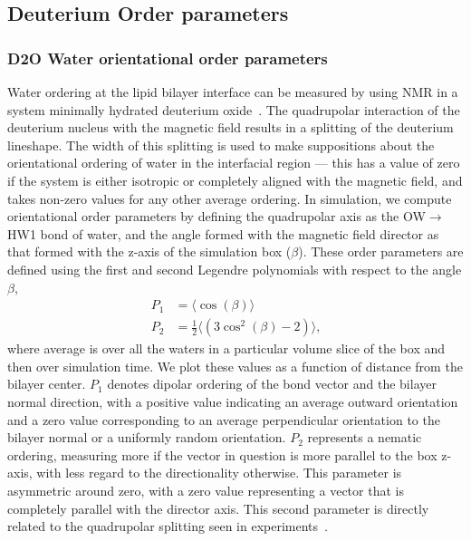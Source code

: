 \subsection{Deuterium Order parameters}
\subsubsection{D2O Water orientational order parameters}
Water ordering at the lipid bilayer interface can be measured by using NMR in a system minimally hydrated deuterium oxide~\cite{aaman:2003}.
The quadrupolar interaction of the deuterium nucleus with the magnetic field results in a splitting of the deuterium lineshape. The width of this splitting 
is used to make suppositions about the orientational ordering of water in the interfacial region --- this has a value of zero if the system is either isotropic or completely aligned with the
magnetic field, and takes non-zero values for any other average ordering.
In simulation, we compute 
orientational order parameters by defining the quadrupolar axis as the
OW$\rightarrow$HW1 bond of water, and the angle formed with the magnetic field director 
as that formed with the z-axis of the simulation box ($\beta$). 
These order parameters are defined using the first and second 
Legendre polynomials with respect to the angle $\beta$,
\begin{equation}
    \begin{split}
    P_1&=\langle \cos\left(\beta\right) \rangle
    \\ P_2&=\frac{1}{2}\bigg\langle\left(3\cos^2\left(\beta\right)-2\right)\bigg\rangle
    \text{,} 
\end{split}
\end{equation}
where average is over all the waters in a particular volume slice of the box 
and then over simulation time.  
We plot these values as a function of distance from the bilayer center. 
$P_1$ denotes dipolar ordering of the bond vector and the bilayer normal direction, 
with a positive value indicating an average outward orientation 
and a zero value corresponding to an average perpendicular orientation to the
bilayer normal or a uniformly random orientation. 
$P_2$ represents a nematic ordering, measuring more if the vector in question is more parallel to the box z-axis, with less regard to the directionality otherwise. This parameter 
is asymmetric around zero, with a zero value representing a vector that is completely parallel with the director axis. This second parameter is directly related to the quadrupolar splitting 
seen in experiments~\cite{aaman:2003,kruczek:2017:ether,saunders:2019}.
